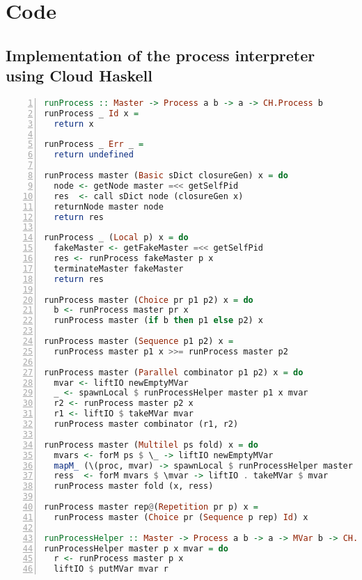 \chapter{Code}

\clearpage

\section{Implementation of the process interpreter using Cloud Haskell}
\label{app:distributed_split_slice}
\begin{lstlisting}[language=Haskell,frame=tb,numbers=left,caption=Implementation of \texttt{runProcess} using \textsf{Cloud Haskell}.]
runProcess :: Master -> Process a b -> a -> CH.Process b
runProcess _ Id x =
  return x

runProcess _ Err _ =
  return undefined

runProcess master (Basic sDict closureGen) x = do
  node <- getNode master =<< getSelfPid
  res  <- call sDict node (closureGen x)
  returnNode master node
  return res

runProcess _ (Local p) x = do
  fakeMaster <- getFakeMaster =<< getSelfPid
  res <- runProcess fakeMaster p x
  terminateMaster fakeMaster
  return res

runProcess master (Choice pr p1 p2) x = do
  b <- runProcess master pr x
  runProcess master (if b then p1 else p2) x

runProcess master (Sequence p1 p2) x =
  runProcess master p1 x >>= runProcess master p2

runProcess master (Parallel combinator p1 p2) x = do
  mvar <- liftIO newEmptyMVar
  _ <- spawnLocal $ runProcessHelper master p1 x mvar
  r2 <- runProcess master p2 x
  r1 <- liftIO $ takeMVar mvar
  runProcess master combinator (r1, r2)

runProcess master (Multilel ps fold) x = do
  mvars <- forM ps $ \_ -> liftIO newEmptyMVar
  mapM_ (\(proc, mvar) -> spawnLocal $ runProcessHelper master proc x mvar) (ps `zip` mvars)
  ress  <- forM mvars $ \mvar -> liftIO . takeMVar $ mvar
  runProcess master fold (x, ress)

runProcess master rep@(Repetition pr p) x =
  runProcess master (Choice pr (Sequence p rep) Id) x

runProcessHelper :: Master -> Process a b -> a -> MVar b -> CH.Process ()
runProcessHelper master p x mvar = do
  r <- runProcess master p x
  liftIO $ putMVar mvar r
\end{lstlisting}


